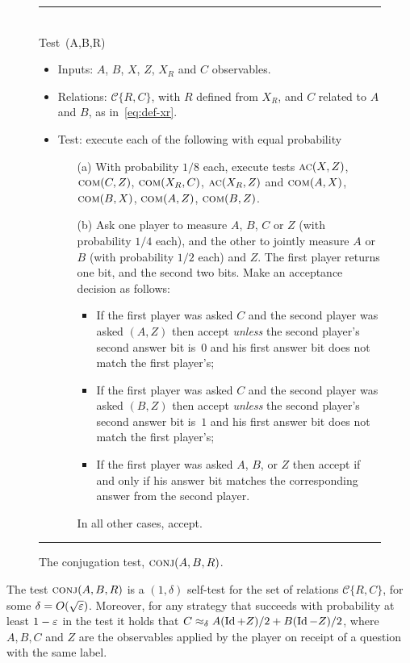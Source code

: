 \begin{figure}[H]
\rule[1ex]{\textwidth}{0.5pt}\\
Test~\conj(A,B,R) 
\begin{itemize}
    \item Inputs: $A$, $B$, $X$, $Z$, $X_R$ and $C$ observables.
    \item Relations:  $\mathcal{C}\{R,C\} $, with $R$ defined from $X_R$, and $C$ related to $A$ and $B$, as in~\eqref{eq:def-xr}. 
    \item Test: execute each of the following with equal probability
		\begin{enumerate}
\item[(a)] With probability $1/8$ each, execute tests $\textsc{ac}(X,Z)$,  $\textsc{com}(C,Z)$, $\textsc{com}(X_R,C)$,   $\textsc{ac}(X_R,Z)$ and $\textsc{com}(A,X)$, $\textsc{com}(B,X)$, $\textsc{com}(A,Z)$, $\textsc{com}(B,Z)$. 
\item[(b)] Ask one player to measure $A$, $B$, $C$ or $Z$ (with probability $1/4$ each), and the other to jointly measure $A$ or $B$ (with probability $1/2$ each) and $Z$. The first player returns one bit, and the second two bits. Make an acceptance decision as follows: 
\begin{itemize}
\item If the first player was asked $C$ and the second player was asked $(A,Z)$ then accept \emph{unless} the second player's second answer bit is~$0$ and his first answer bit does not match the first player's;
\item If the first player was asked $C$ and the second player was asked $(B,Z)$ then accept \emph{unless} the second player's second answer bit is~$1$ and his first answer bit does not match the first player's;
\item If the first player was asked $A$, $B$, or $Z$ then accept if and only if his answer bit matches the corresponding answer from the second player.
\end{itemize}
In all other cases, accept. 
\end{enumerate}
\end{itemize}
\rule[2ex]{\textwidth}{0.5pt}\vspace{-0.5cm}
\caption{The conjugation test, $\textsc{conj}(A,B,R)$.}
\label{fig:conjugation-test-1}
\end{figure}

\begin{lemma}\label{lem:conj}
The test $\textsc{conj}(A,B,R)$ is a $(1,\delta)$ self-test for the set of relations
  $\mathcal{C}\{R,C\}$, for some $\delta = O(\sqrt{\varepsilon})$. Moreover, for any
  strategy that succeeds with probability at least $1-\varepsilon$ in the test it holds
  that $C \approx_{\delta} A  (\mathop{\rm Id}\nolimits+Z)/2 + B
 (\mathop{\rm Id}\nolimits-Z)/2$, where $A,B,C$ and $Z$ are the observables applied by the player on receipt of a question with the same label. 
\end{lemma}

